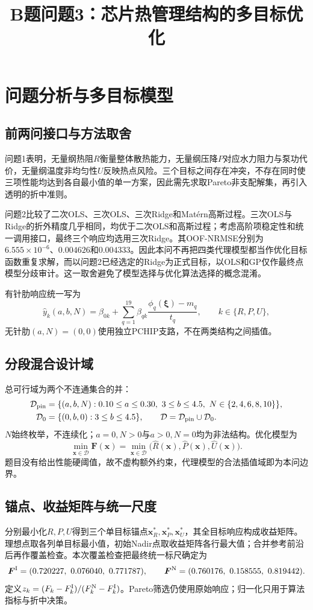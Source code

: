 ﻿\documentclass[UTF8,a4paper,11pt]{ctexart}
\title{\textcolor{apmblue}{B题问题3：芯片热管理结构的多目标优化}}
\author{}\date{}
\begin{document}
\maketitle

\section{问题分析与多目标模型}
\subsection{前两问接口与方法取舍}
问题1表明，无量纲热阻$R$衡量整体散热能力，无量纲压降$P$对应水力阻力与泵功代价，无量纲温度非均匀性$U$反映热点风险。三个目标之间存在冲突，不存在同时使三项性能均达到各自最小值的单一方案，因此需先求取Pareto非支配解集，再引入透明的折中准则。

问题2比较了二次OLS、三次OLS、三次Ridge和Mat\'ern高斯过程。三次OLS与Ridge的折外精度几乎相同，均优于二次OLS和高斯过程；考虑高阶项稳定性和统一调用接口，最终三个响应均选用三次Ridge。其OOF-NRMSE分别为$6.555\times10^{-6}$、$0.004626$和$0.004333$。因此本问不再把四类代理模型都当作优化目标函数重复求解，而以问题2已经选定的Ridge为正式目标，以OLS和GP仅作最终点模型分歧审计。这一取舍避免了模型选择与优化算法选择的概念混淆。

有针肋响应统一写为
\[
 \widehat y_k(a,b,N)=\beta_{0k}+\sum_{q=1}^{19}\beta_{qk}
 \frac{\phi_q(\bm\xi)-m_q}{t_q},\qquad k\in\{R,P,U\},
\]
无针肋$(a,N)=(0,0)$使用独立PCHIP支路，不在两类结构之间插值。

\subsection{分段混合设计域}
总可行域为两个不连通集合的并：
\[
\begin{split}
\mathcal D_{\rm pin}&=\{(a,b,N):0.10\le a\le0.30,\ 3\le b\le4.5,\ N\in\{2,4,6,8,10\}\},\\
\mathcal D_0&=\{(0,b,0):3\le b\le4.5\},\qquad \mathcal D=\mathcal D_{\rm pin}\cup\mathcal D_0.
\end{split}
\]
$N$始终枚举，不连续化；$a=0,N>0$与$a>0,N=0$均为非法结构。优化模型为
\[
 \min_{\bm x\in\mathcal D}\bm F(\bm x)
 =\min_{\bm x\in\mathcal D}\bigl(\widehat R(\bm x),\widehat P(\bm x),\widehat U(\bm x)\bigr).
\]
题目没有给出性能硬阈值，故不虚构额外约束，代理模型的合法插值域即为本问边界。

\subsection{锚点、收益矩阵与统一尺度}
分别最小化$R,P,U$得到三个单目标锚点$\bm x_R^*,\bm x_P^*,\bm x_U^*$，其全目标响应构成收益矩阵。理想点取各列单目标最小值，初始Nadir点取收益矩阵各行最大值；合并参考前沿后再作覆盖检查。本次覆盖检查把最终统一标尺确定为
\[
 \bm F^{\rm I}=(0.720227,\ 0.076040,\ 0.771787),\qquad
 \bm F^{\rm N}=(0.760176,\ 0.158555,\ 0.819442).
\]
定义$z_k=(F_k-F_k^{\rm I})/(F_k^{\rm N}-F_k^{\rm I})$。Pareto筛选仍使用原始响应；归一化只用于算法指标与折中决策。
\end{document}

